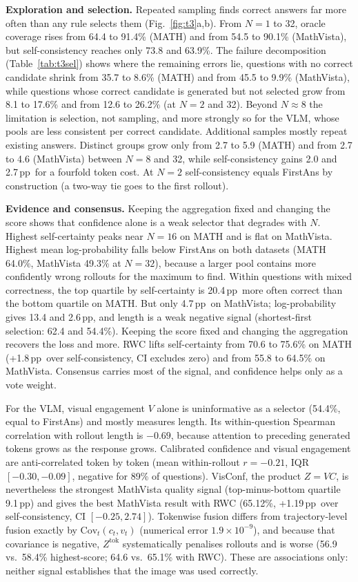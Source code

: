 \documentclass{article}
\newcommand{\pp}{\,pp}
\begin{document}
\textbf{Exploration and selection.} Repeated sampling finds correct answers far more often than any rule selects them (Fig.~\ref{fig:t3}a,b). From $N{=}1$ to 32, oracle coverage rises from 64.4 to 91.4\% (MATH) and from 54.5 to 90.1\% (MathVista), but self-consistency reaches only 73.8 and 63.9\%. The failure decomposition (Table~\ref{tab:t3sel}) shows where the remaining errors lie, questions with no correct candidate shrink from 35.7 to 8.6\% (MATH) and from 45.5 to 9.9\% (MathVista), while questions whose correct candidate is generated but not selected grow from 8.1 to 17.6\% and from 12.6 to 26.2\% (at $N{=}2$ and 32). Beyond $N\approx8$ the limitation is selection, not sampling, and more strongly so for the VLM, whose pools are less consistent per correct candidate. Additional samples mostly repeat existing answers. Distinct groups grow only from 2.7 to 5.9 (MATH) and from 2.7 to 4.6 (MathVista) between $N{=}8$ and 32, while self-consistency gains 2.0 and 2.7\pp\ for a fourfold token cost. At $N{=}2$ self-consistency equals FirstAns by construction (a two-way tie goes to the first rollout).

\textbf{Evidence and consensus.} Keeping the aggregation fixed and changing the score shows that confidence alone is a weak selector that degrades with $N$. Highest self-certainty peaks near $N{=}16$ on MATH and is flat on MathVista. Highest mean log-probability falls below FirstAns on both datasets (MATH 64.0\%, MathVista 49.3\% at $N{=}32$), because a larger pool contains more confidently wrong rollouts for the maximum to find. Within questions with mixed correctness, the top quartile by self-certainty is 20.4\pp\ more often correct than the bottom quartile on MATH. But only 4.7\pp\ on MathVista; log-probability gives 13.4 and 2.6\pp, and length is a weak negative signal (shortest-first selection: 62.4 and 54.4\%). Keeping the score fixed and changing the aggregation recovers the loss and more. RWC lifts self-certainty from 70.6 to 75.6\% on MATH (+1.8\pp\ over self-consistency, CI excludes zero) and from 55.8 to 64.5\% on MathVista. Consensus carries most of the signal, and confidence helps only as a vote weight.

For the VLM, visual engagement $V$ alone is uninformative as a selector (54.4\%, equal to FirstAns) and mostly measures length. Its within-question Spearman correlation with rollout length is $-0.69$, because attention to preceding generated tokens grows as the response grows. Calibrated confidence and visual engagement are anti-correlated token by token (mean within-rollout $r{=}-0.21$, IQR $[-0.30,-0.09]$, negative for 89\% of questions). VisConf, the product $Z{=}VC$, is nevertheless the strongest MathVista quality signal (top-minus-bottom quartile 9.1\pp) and gives the best MathVista result with RWC (65.12\%, +1.19\pp\ over self-consistency, CI $[-0.25, 2.74]$). Tokenwise fusion differs from trajectory-level fusion exactly by $\mathrm{Cov}_t(c_t, v_t)$ (numerical error $1.9\times10^{-9}$), and because that covariance is negative, $Z^\text{tok}$ systematically penalises rollouts and is worse (56.9 vs.\ 58.4\% highest-score; 64.6 vs.\ 65.1\% with RWC). These are associations only: neither signal establishes that the image was used correctly.
\end{document}
